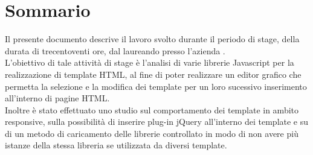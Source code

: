 
\cleardoublepage
{}
{}
\begingroup
\let\clearpage\relax
\let\cleardoublepage\relax
\let\cleardoublepage\relax

\chapter*{Sommario}

Il presente documento descrive il lavoro svolto durante il periodo di stage, della durata di trecentoventi ore, dal laureando \myName presso l'azienda \myCompany.\\
L'obiettivo di tale attività di stage è l'analisi di varie librerie Javascript per la realizzazione di template HTML, al fine di poter realizzare un editor grafico che permetta la selezione e la modifica dei template per un loro sucessivo inserimento all'interno di pagine HTML.\\
Inoltre è stato effettuato uno studio sul comportamento dei template in ambito responsive, sulla possibilità di inserire plug-in jQuery all'interno dei template e su di un metodo di caricamento delle librerie controllato in modo di non avere più istanze della stessa libreria se utilizzata da diversi template.
%
%

\endgroup			

\vfill

